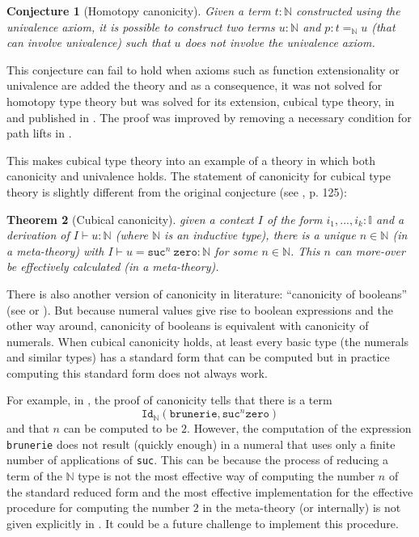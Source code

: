 \documentclass[12pt,a4paper,twoside,xetex]{book} %
\newtheorem{theorem}{Theorem}[section]
\newtheorem{conjecture}[theorem]{Conjecture}
\newcommand{\op}[1]{\mathtt{#1}}
\begin{document}
\begin{conjecture}[Homotopy canonicity]
Given a term $t: \mathbb{N}$ constructed using the univalence axiom, it is 
possible to 
construct two terms $u : \mathbb{N}$ and $p : t =_{\mathbb{N}} u$ (that can 
involve univalence) such that $u$ 
does not involve the univalence axiom.
\end{conjecture}

This conjecture can fail to hold when axioms such as function extensionality or 
univalence are added the theory and as a consequence, it was not solved for 
homotopy type theory but was solved for its extension, cubical type theory, in 
\cite{Huber2016} and published in \cite{Huber2017}. The proof was improved by 
removing a necessary condition for path lifts in
\cite{Coquand2019}.  

This makes cubical type theory into an example of a theory 
in which both canonicity and univalence holds. The statement of canonicity for 
cubical type theory is slightly different from the original conjecture (see 
\cite{Huber2016}, p. 125): 

\begin{theorem}[Cubical canonicity]\label{canonicity}
given a context $I$ of the form $i_1, ..., i_k : \mathbb{I}$ and a derivation 
of 
$I \vdash u : \mathbb{N}$ (where $\mathbb{N}$ is an inductive type), there is a 
unique $n \in \mathbb{N}$ (in a meta-theory) with $I \vdash u = \op{suc}^n \  
\op{zero} : \mathbb{N}$ for some $n \in \mathbb{N}$. This $n$ can more-over be 
effectively calculated (in a meta-theory). 
\end{theorem}

There is also another version of canonicity in literature: ``canonicity of booleans'' (see \cite{Angiuli2018} 
or \Cref{comptt}). But 
because numeral values give rise to boolean expressions and the other way 
around, canonicity of booleans is equivalent with canonicity of numerals. When 
cubical canonicity holds, at least every basic type (the numerals and similar 
types) has a standard form that can be computed but in practice computing 
this standard form does not always work.

For example, in , 
the proof of canonicity tells that there is a term 
$$\texttt{Id}_{\mathbb{N}}(\texttt{brunerie}, \texttt{suc}^n 
\texttt{zero})$$ and that  $n$ can be computed to be $2$. However, the 
computation of the expression \texttt{brunerie} does not result (quickly 
enough) in a numeral that uses only a finite number of applications of 
\texttt{suc}. This can be because the process of reducing a term of the 
$\mathbb{N}$ type is not the most effective way of computing the number $n$ of 
the standard reduced form and the most effective implementation for the effective procedure for computing the 
number $2$ in the meta-theory (or internally) is 
not given explicitly in \cite{Coquand2019}. It could be a future challenge to implement this procedure. 
\end{document}
